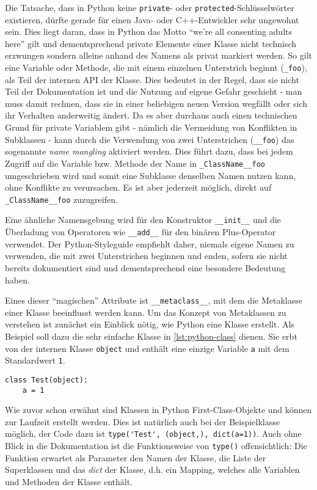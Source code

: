 Die Tatsache, dass in Python keine \lstinline{private}- oder \lstinline{protected}-Schlüsselwörter
existieren, dürfte gerade für einen Java- oder C++-Entwickler sehr ungewohnt sein. Dies liegt
daran, dass in Python das Motto \enquote{we're all consenting adults here} \citep{pymail:adults}
gilt und dementsprechend private Elemente einer Klasse nicht technisch erzwungen sondern alleine
anhand des Namens als privat markiert werden. So gilt eine Variable oder Methode, die mit einem
einzelnen Unterstrich beginnt (\lstinline{_foo}), als Teil der internen API der Klasse. Dies
bedeutet in der Regel, dass sie nicht Teil der Dokumentation ist und die Nutzung auf eigene Gefahr
geschieht - man muss damit rechnen, dass sie in einer beliebigen neuen Version wegfällt oder sich
ihr Verhalten anderweitig ändert. Da es aber durchaus auch einen technischen Grund für private
Variablem gibt - nämlich die Vermeidung von Konflikten in Subklassen - kann durch die Verwendung von
zwei Unterstrichen (\lstinline{__foo}) das sogenannte \emph{name mangling} aktiviert werden. Dies
führt dazu, dass bei jedem Zugriff auf die Variable bzw. Methode der Name in
\lstinline{_ClassName__foo} umgeschrieben wird und somit eine Subklasse denselben Namen nutzen kann,
ohne Konflikte zu verursachen. Es ist aber jederzeit möglich, direkt auf \lstinline{_ClassName__foo}
zuzugreifen.

Eine ähnliche Namensgebung wird für den Konstruktor \lstinline{__init__} und die Überladung von
Operatoren wie \lstinline{__add__} für den binären Plus-Operator verwendet. Der
Python-Styleguide empfiehlt daher, niemals eigene Namen zu verwenden, die mit zwei Unterstrichen
beginnen und enden, sofern sie nicht bereits dokumentiert sind und dementsprechend eine besondere
Bedeutung haben.

Eines dieser \enquote{magischen} Attribute ist \lstinline{__metaclass__}, mit dem die Metaklasse
einer Klasse beeinflusst werden kann. Um das Konzept von Metaklassen zu verstehen ist zunächst ein
Einblick nötig, wie Python eine Klasse erstellt. Als Beispiel soll dazu die sehr einfache Klasse in
\autoref{lst:python-class} dienen. Sie erbt von der internen Klasse \lstinline{object} und enthält
eine einzige Variable \lstinline{a} mit dem Standardwert \lstinline{1}.

\begin{lstlisting}[caption=Python-Klassendefinition,label=lst:python-class]
class Test(object):
    a = 1
\end{lstlisting}

Wie zuvor schon erwähnt sind Klassen in Python First-Class-Objekte und können zur Laufzeit erstellt
werden. Dies ist natürlich auch bei der Beispielklasse möglich, der Code dazu ist
\lstinline{type('Test', (object,), dict(a=1))}.
Auch ohne Blick in die Dokumentation ist die Funktionsweise von \lstinline{type()} offensichtlich:
Die Funktion erwartet als Parameter den Namen der Klasse, die Liste der Superklassen und das
\emph{dict} der Klasse, d.h. ein Mapping, welches alle Variablen und Methoden der Klasse enthält.

